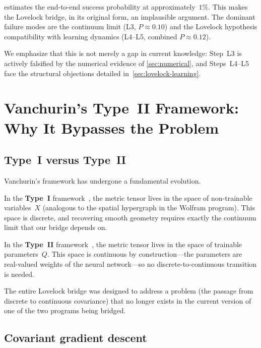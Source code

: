 \documentclass[11pt]{article}
\theoremstyle{definition}
\theoremstyle{remark}
\begin{document}
 estimates the end-to-end success probability at
approximately~$1\%$.
This makes the Lovelock bridge, in its original form, an implausible
argument.
The dominant failure modes are the continuum limit (L3, $P \approx 0.10$)
and the Lovelock hypothesis compatibility with learning dynamics
(L4--L5, combined $P \approx 0.12$).

We emphasize that this is not merely a gap in current knowledge: Step~L3
is actively falsified by the numerical evidence of \cref{sec:numerical},
and Steps~L4--L5 face the structural objections detailed
in~\cref{sec:lovelock-learning}.

\section{Vanchurin's Type~II Framework: Why It Bypasses the Problem}
\label{sec:typeII}

\subsection{Type~I versus Type~II}
\label{sec:type-I-vs-II}

Vanchurin's framework has undergone a fundamental evolution.

In the \textbf{Type~I} framework~\cite{Vanchurin2020}, the metric tensor
lives in the space of non-trainable variables~$X$ (analogous to the
spatial hypergraph in the Wolfram program).
This space is discrete, and recovering smooth geometry requires exactly
the continuum limit that our bridge depends on.

In the \textbf{Type~II} framework~\cite{Vanchurin2025,Vanchurin2025CGD},
the metric tensor lives in the space of trainable parameters~$Q$.
This space is continuous by construction---the parameters are
real-valued weights of the neural network---so no discrete-to-continuous
transition is needed.

The entire Lovelock bridge was designed to address a problem (the
passage from discrete to continuous covariance) that no longer exists in
the current version of one of the two programs being bridged.

\subsection{Covariant gradient descent}
\label{sec:CGD}
\end{document}
